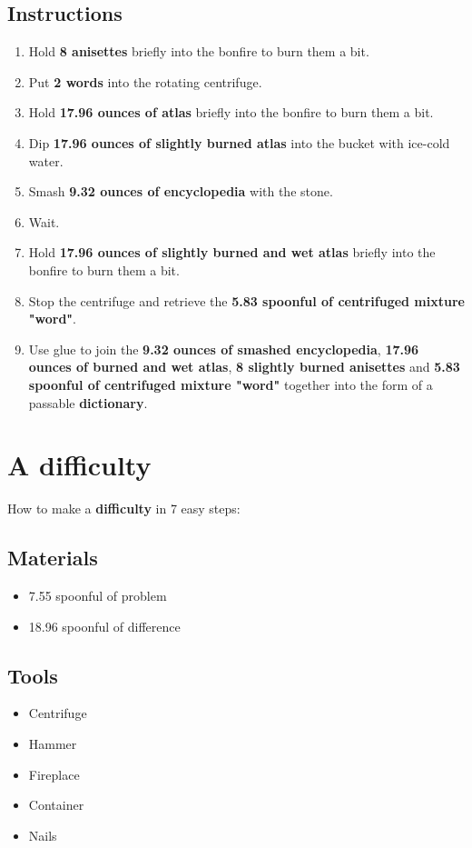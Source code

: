 \documentclass{article}
\begin{document}
\subsection{Instructions}\begin{enumerate}
\item 
Hold \textbf{8 anisettes} briefly into the bonfire to burn them a bit.
\item 
Put \textbf{2 words} into the rotating centrifuge.
\item 
Hold \textbf{17.96 ounces of atlas} briefly into the bonfire to burn them a bit.
\item 
Dip \textbf{17.96 ounces of slightly burned atlas} into the bucket with ice-cold water.
\item 
Smash \textbf{9.32 ounces of encyclopedia} with the stone.
\item 
Wait.
\item 
Hold \textbf{17.96 ounces of slightly burned and wet atlas} briefly into the bonfire to burn them a bit.
\item 
Stop the centrifuge and retrieve the \textbf{5.83 spoonful of centrifuged mixture "word"}.
\item 
Use glue to join the \textbf{9.32 ounces of smashed encyclopedia}, \textbf{17.96 ounces of burned and wet atlas}, \textbf{8 slightly burned anisettes} and \textbf{5.83 spoonful of centrifuged mixture "word"} together into the form of a passable \textbf{dictionary}.
\end{enumerate}
\newpage
\section{A difficulty}How to make a \textbf{difficulty} in 7 easy steps:

\subsection{Materials}\begin{itemize}
\item 
7.55 spoonful of problem
\item 
18.96 spoonful of difference
\end{itemize}
\subsection{Tools}\begin{itemize}
\item 
Centrifuge
\item 
Hammer
\item 
Fireplace
\item 
Container
\item 
Nails
\end{itemize}
\end{document}
